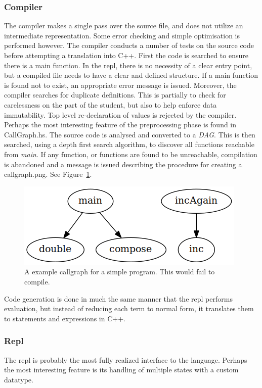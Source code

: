 \documentclass[12pt, a4paper]{report}
\begin{document}
\subsubsection{Compiler}
The compiler makes a single pass over the source file, and does not utilize an intermediate
representation. Some error checking and simple optimisation is performed however. The compiler
conducts a number of tests on the source code before attempting a translation into C++. First the
code is searched to ensure there is a main function. In the repl, there is no necessity of a clear
entry point, but a compiled file needs to have a clear and defined structure. If a main function is
found not to exist, an appropriate error message is issued. Moreover, the compiler searches for
duplicate definitions. This is partially to check for carelessness on the part of the student, but
also to help enforce data immutability. Top level re-declaration of values is rejected by the
compiler. Perhaps the most interesting feature of the preprocessing phase is found in CallGraph.hs.
The source code is analysed and converted to a \textit{\gls{DAG}}. This is then
searched, using a depth first search algorithm, to discover all functions reachable from
\textit{main}. If any function, or functions are found to be unreachable, compilation is abandoned
and a message is issued describing the procedure for creating a callgraph.png. See
Figure~\ref{fig:callgraph}.

\begin{figure}
    \includegraphics[scale=0.6]{images/callgraph.png}
    {\caption{A example callgraph for a simple program. This would fail to compile.}
\label{fig:callgraph}}
\end{figure}

Code generation is done in much the same manner that the repl performs evaluation, but instead of
reducing each term to normal form, it translates them to statements and expressions in C++. 

\subsubsection{Repl}
The repl is probably the most fully realized interface to the language. Perhaps the most interesting
feature is its handling of multiple states with a custom datatype. 
\end{document}
